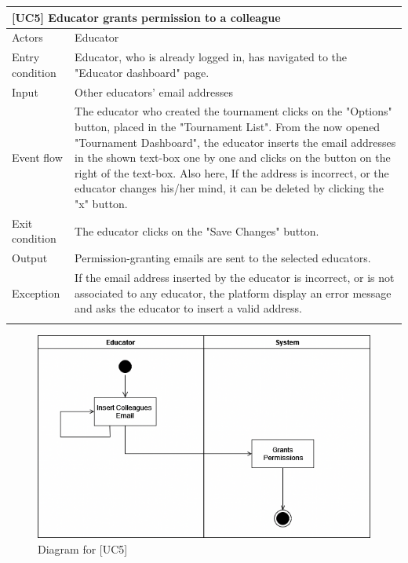\documentclass[12pt,oneside,a4paper]{article}
\begin{document}
\begin{table}[htbp]
\begin{tabular}{|l|p{12cm}|}
    \hline
    \multicolumn{2}{|l|}{\textbf{[UC5] Educator grants permission to a colleague}}\\
    \hline
    Actors & Educator\\
    \hline
    Entry condition & Educator, who is already logged in, has navigated to the "Educator dashboard" page.\\
    \hline
    Input & Other educators' email addresses\\
    \hline
    Event flow & The educator who created the tournament clicks on the "Options" button, placed in the "Tournament List". From the now opened "Tournament Dashboard", the educator inserts the email addresses in the shown text-box one by one and clicks on the button on the right of the text-box. Also here, If the address is incorrect, or the educator changes his/her mind, it can be deleted by clicking the "x" button.\\
    \hline
    Exit condition & The educator clicks on the "Save Changes" button.\\
    \hline
    Output & Permission-granting emails are sent to the selected educators.\\
    \hline
    Exception & If the email address inserted by the educator is incorrect, or is not associated to any educator, the platform display an error message and asks the educator to insert a valid address.\\
    \lasthline
\end{tabular}
\end{table}

\begin{figure}[htbp]
    \centering
    \includegraphics[width=1\linewidth]{Images/Diagrams/GrantPermission.png}
    \caption{Diagram for [UC5]}
    \label{fig:enter-label}
\end{figure}
\end{document}
